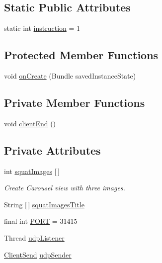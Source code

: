 \subsection*{Static Public Attributes}
\begin{DoxyCompactItemize}
\item 
static int \mbox{\hyperlink{classcom_1_1example_1_1trainawearapplication_1_1_classic_squat_a3cbf1db0a5560d931ebdaa407a1a6285}{instruction}} = 1
\end{DoxyCompactItemize}
\subsection*{Protected Member Functions}
\begin{DoxyCompactItemize}
\item 
void \mbox{\hyperlink{classcom_1_1example_1_1trainawearapplication_1_1_classic_squat_afa5582341ba5a9609e4eb7d539741e6a}{on\+Create}} (Bundle saved\+Instance\+State)
\end{DoxyCompactItemize}
\subsection*{Private Member Functions}
\begin{DoxyCompactItemize}
\item 
void \mbox{\hyperlink{classcom_1_1example_1_1trainawearapplication_1_1_classic_squat_a8f22682b2ad8898b8242090342c1ab53}{client\+End}} ()
\end{DoxyCompactItemize}
\subsection*{Private Attributes}
\begin{DoxyCompactItemize}
\item 
int \mbox{\hyperlink{classcom_1_1example_1_1trainawearapplication_1_1_classic_squat_af799c82f2b94685d95b462b3df104344}{squat\+Images}} \mbox{[}$\,$\mbox{]}
\begin{DoxyCompactList}\small\item\em Create Carousel view with three images. \end{DoxyCompactList}\item 
String \mbox{[}$\,$\mbox{]} \mbox{\hyperlink{classcom_1_1example_1_1trainawearapplication_1_1_classic_squat_a3a3fa8bda7ea911bae8e086e0e5e86dc}{squat\+Images\+Title}}
\item 
final int \mbox{\hyperlink{classcom_1_1example_1_1trainawearapplication_1_1_classic_squat_a28250169a237362b6ab0a7412cd12da6}{P\+O\+RT}} = 31415
\item 
Thread \mbox{\hyperlink{classcom_1_1example_1_1trainawearapplication_1_1_classic_squat_a5c6683281be124ed40b4ad73bcec89fc}{udp\+Listener}}
\item 
\mbox{\hyperlink{classcom_1_1example_1_1trainawearapplication_1_1_client_send}{Client\+Send}} \mbox{\hyperlink{classcom_1_1example_1_1trainawearapplication_1_1_classic_squat_af9d9055eef7e92d48f0f544bec3a7abd}{udp\+Sender}}
\end{DoxyCompactItemize}


